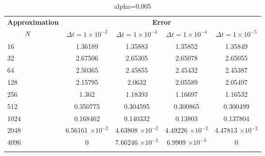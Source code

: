 	
	\begin{table}
		\begin{tabular}{lcccc}
			\toprule
			\multicolumn{1}{c}{\textbf{Approximation}} & \multicolumn{4}{c}{\textbf{Error}} \\
			$\hspace{9mm}N$ & $\Delta t=1\times 10^{-2}$ & $\Delta t=1\times 10^{-3}$ & $\Delta t=1\times 10^{-4}$ & $\Delta t=1\times 10^{-5}$ \\
			\midrule
			\hspace{7mm} 16 & 1.36189   & 1.35883    & 1.35852   & 1.35849   \\
			\midrule
			\hspace{7mm} 32 & 2.67506   & 2.65305    & 2.65078   & 2.65055   \\
			\midrule
			\hspace{7mm} 64 & 2.50365   & 2.45855    & 2.45432   & 2.45387   \\
			\midrule
			\hspace{7mm} 128 & 2.15795   & 2.0632     & 2.05589   & 2.05497   \\
			\midrule
			\hspace{7mm} 256 & 1.362     & 1.18393    & 1.16697   & 1.16532   \\
			\midrule
			\hspace{7mm} 512 & 0.350775  & 0.304595   & 0.300865  & 0.300499  \\
			\midrule
			\hspace{7mm} 1024 & 0.168462  & 0.140332   & 0.13803   & 0.137804  \\
			\midrule
			\hspace{7mm} 2048 & 6.56161 $\times 10^{-2}$ & 4.63808 $\times 10^{-2}$  & 4.49226 $\times 10^{-2}$ & 4.47813 $\times 10^{-2}$ \\
			\midrule
			\hspace{7mm} 4096 & 0         & 7.66246 $\times 10^{-3}$ & 6.9909 $\times 10^{-3}$ & 0         \\
			\\
			\bottomrule
		\end{tabular}
		\caption{alpha=0.005}
	\end{table}

